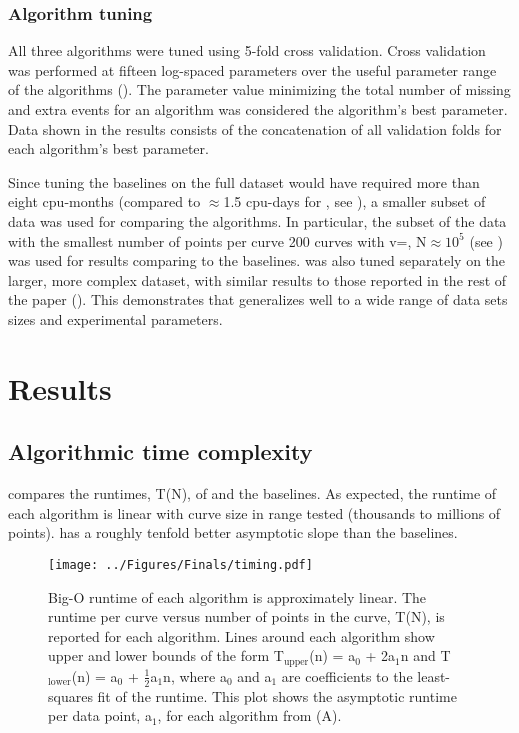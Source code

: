 \subsection{Algorithm tuning}

All three algorithms were tuned using 5-fold cross validation. Cross validation was performed at fifteen log-spaced parameters over the useful parameter range of the algorithms (). The parameter value minimizing the total number of missing and extra events for an algorithm was considered the algorithm's best parameter. Data shown in the results consists of the concatenation of all validation folds for each algorithm's best parameter. 

Since tuning the baselines on the full dataset would have required more than eight cpu-months (compared to $\approx$1.5 cpu-days for \name{}, see ), a smaller subset of data was used for comparing the algorithms. In particular, the subset of the data with the smallest number of points per curve \textemdash{} 200 curves with v=, N$\approx10^{5}$ (see ) \textemdash{} was used for results comparing \name{} to the baselines. \name{} was also tuned separately on the larger, more complex dataset, with similar results to those reported in the rest of the paper (). This demonstrates that \name{} generalizes well to a wide range of data sets sizes and experimental parameters.

\chapter{Results}

\section{Algorithmic time complexity}

 compares the runtimes, T(N), of \name{} and the baselines. As expected, the runtime of each algorithm is linear with curve size in range tested (thousands to millions of points). \name{} has a roughly tenfold better asymptotic slope than the baselines.  

\begin{figure}[htpb]
\caption[Runtime versus length of curve]{\noindent{} Big-O runtime of each algorithm is approximately linear.  The runtime per curve versus number of points in the curve, T(N), is reported for each algorithm. Lines around each algorithm show upper and lower bounds of the form T$_{\mathrm{upper}}$(n) = a$_0$ + 2a$_1$n  and T$_{\mathrm{lower}}$(n) = a$_0$ + $\frac{1}{2}$a$_1$n, where a$_0$ and a$_1$ are coefficients to the least-squares fit of the runtime.  This plot shows the asymptotic runtime per data point, a$_1$, for each algorithm from (A). }
\centering
\texttt{[image: ../Figures/Finals/timing.pdf]}%
\end{figure}

